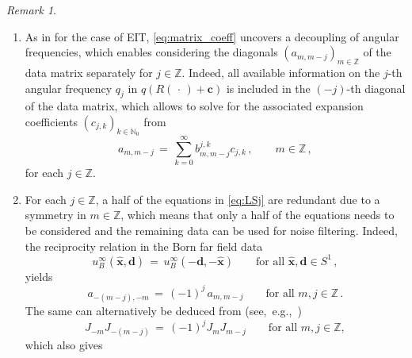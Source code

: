 \documentclass[11pt,a4paper]{article}
\theoremstyle{definition}
\theoremstyle{remark} \newtheorem{remark}[theorem]{Remark}
\numberwithin{equation}{section}
\numberwithin{figure}{section}
\numberwithin{algorithm}{section}
\numberwithin{table}{section}
\newcommand{\field}[1]{{\mathbb{#1}}}
\newcommand{\N}{\field{N}}
\newcommand{\Z}{\field{Z}}
\newcommand{\bs}{\boldsymbol}
\newcommand{\bfc}{{\bs c}}
\newcommand{\bfd}{{\bs d}}
\newcommand{\bfx}{{\bs x}}
\newcommand{\xhat}{\widehat{\bfx}}
\newcommand{\idir}{\bfd}
\newcommand{\ph}{\,\cdot\,}
\newcommand{\Sone}{{S^1}}
\begin{document}
\begin{remark}
\label{rem:propertiesLS}
    \begin{enumerate}
        \item[(i)] As in \cite{AutGarHirHvy24,GarHyv24} for the case of EIT, \eqref{eq:matrix_coeff} uncovers a decoupling of angular frequencies, which enables considering the diagonals $(a_{m,m-j})_{m\in\Z}$ of the data matrix separately for $j\in\Z$.
    Indeed, all available information on the $j$-th angular frequency $q_j$ in $q(R(\ph)+\bfc)$ is included in the $(-j)$-th diagonal of the data matrix, which allows to solve for the associated expansion coefficients $( c_{j,k} )_{k \in \N_0}$ from
        \begin{equation}
        \label{eq:LSj}
            a_{m,m-j}
            \,=\, \sum_{k=0}^\infty b_{m,m-j}^{j,k} c_{j,k}\,,
            \qquad m\in\Z\, ,
        \end{equation}
        for each $j \in \Z$.
        \item[(ii)]  For each $j\in\Z$, a half of the equations in \eqref{eq:LSj} are redundant due to a symmetry in  $m \in \Z$, which means that only a half of the equations needs to be considered and the remaining data can be used for noise filtering.
        Indeed, the reciprocity relation in the Born far field data
        \begin{equation*}
            u^\infty_B(\xhat,\idir) \,=\, u^\infty_B(-\idir,-\xhat)
            \qquad \text{for all } \xhat,\idir\in\Sone\,,
        \end{equation*}
        yields~\cite[Eq.~(2.28)]{GriSch24}
        \begin{equation}
        \label{eq:a_symmetry}
           a_{-(m-j),-m} \,=\,  (-1)^j\, a_{m,m-j}  \qquad \text{for all } m, j \in\Z\,.
        \end{equation}
        The same can alternatively be deduced from (see,~e.g.,~\cite[Eq.~(10.4.1)]{NIST:DLMF})
        \begin{equation*}
            J_{-m}J_{-(m-j)} \,=\, (-1)^jJ_mJ_{m-j}
            \qquad \text{for all } m, j \in\Z,
        \end{equation*}
       which also gives  
        \begin{equation*}

\end{equation*}
\end{enumerate}
\end{remark}
\end{document}
